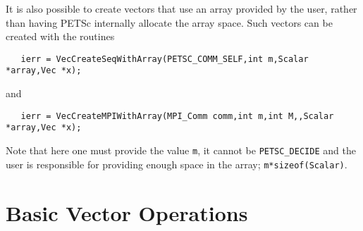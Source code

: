 It is also possible to create vectors that use an array provided by the user, 
rather than having PETSc internally allocate the array space. 
Such vectors can be created with the routines
\begin{verbatim}
   ierr = VecCreateSeqWithArray(PETSC_COMM_SELF,int m,Scalar *array,Vec *x);
\end{verbatim}
and   
\begin{verbatim}
   ierr = VecCreateMPIWithArray(MPI_Comm comm,int m,int M,,Scalar *array,Vec *x);
\end{verbatim}
Note that here one must provide the value {\tt m}, it cannot be {\tt PETSC\_DECIDE} and
the user is responsible for providing enough space in the array; {\tt m*sizeof(Scalar)}.


\section{Basic Vector Operations}  
\label{sec:vecbasic}

